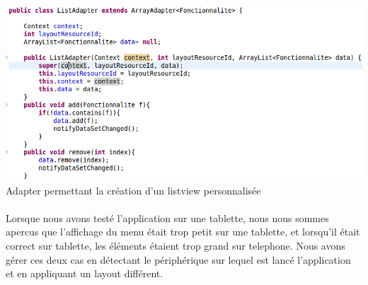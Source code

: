 \begin{center}
	\includegraphics[width=140mm]{images/list_adapter.png}
	Adapter permettant la création d'un listview personnalisée
\end{center}

\paragraph{}
Lorsque nous avons testé l'application sur une tablette, nous nous sommes apercus que l'affichage du menu était trop petit sur une tablette, et lorsqu'il était correct sur tablette, les éléments étaient trop grand sur telephone. Nous avons gérer ces deux cas en détectant le périphérique sur lequel est lancé l'application et en appliquant un layout différent.

\begin{center}
\end{center}

